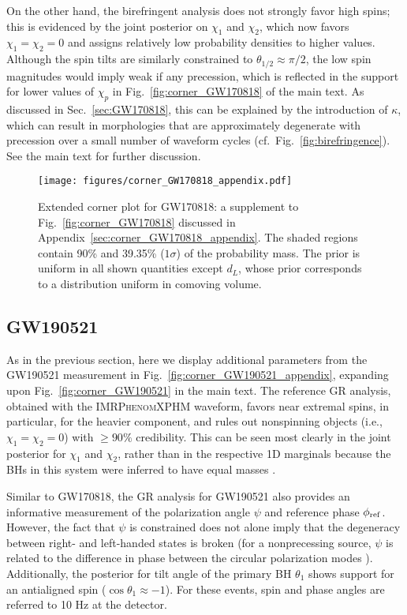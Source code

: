 \documentclass[aps,prd,twocolumn,superscriptaddress,preprintnumbers,nofootinbib]{revtex4-2}
\begin{document}
On the other hand, the birefringent analysis does not strongly favor high spins; this is evidenced by the joint posterior on $\chi_1$ and $\chi_2$, which now favors $\chi_1 = \chi_2 = 0$ and assigns relatively low probability densities to higher values.
Although the spin tilts are similarly constrained to $\theta_{1/2} \approx \pi/2$, the low spin magnitudes would imply weak if any precession, which is reflected in the support for lower values of $\chi_p$ in Fig.~\ref{fig:corner_GW170818} of the main text.
As discussed in Sec.~\ref{sec:GW170818}, this can be explained by the introduction of $\kappa$, which can result in morphologies that are approximately degenerate with precession over a small number of waveform cycles (cf.~Fig.~\ref{fig:birefringence}).
See the main text for further discussion.

\begin{figure*}[h]
    \texttt{[image: figures/corner\_GW170818\_appendix.pdf]}
    \caption{
        Extended corner plot for GW170818: a supplement to Fig.~\ref{fig:corner_GW170818} discussed in Appendix~\ref{sec:corner_GW170818_appendix}.
        The shaded regions contain 90\% and 39.35\% ($1\sigma$) of the probability mass.
        The prior is uniform in all shown quantities except $d_L$, whose prior corresponds to a distribution uniform in comoving volume.
    }
    \label{fig:corner_GW170818_appendix}
\end{figure*}

\subsection{GW190521}
\label{sec:corner_GW190521_appendix}

As in the previous section, here we display additional parameters from the GW190521 measurement in Fig.~\ref{fig:corner_GW190521_appendix}, expanding upon Fig.~\ref{fig:corner_GW190521} in the main text.
The reference \ac{GR} analysis, obtained with the \textsc{IMRPhenomXPHM} waveform, favors near extremal spins, in particular, for the heavier component, and rules out nonspinning objects (i.e., $\chi_1 = \chi_2 = 0$) with $\geq 90\%$ credibility.
This can be seen most clearly in the joint posterior for $\chi_1$ and $\chi_2$, rather than in the respective 1D marginals because the \acp{BH} in this system were inferred to have equal masses \cite{Biscoveanu:2020are}.

Similar to GW170818, the \ac{GR} analysis for GW190521 also provides an informative measurement of the polarization angle $\psi$ and reference phase $\phi_{\rm ref}$.
However, the fact that $\psi$ is constrained does not alone imply that the degeneracy between right- and left-handed states is broken (for a nonprecessing source, $\psi$ is related to the difference in phase between the circular polarization modes \cite{Isi:2022mbx}).
Additionally, the posterior for tilt angle of the primary \ac{BH} $\theta_1$ shows support for an antialigned spin ($\cos\theta_1 \approx -1$).
For these events, spin and phase angles are referred to 10 Hz at the detector.
\end{document}
